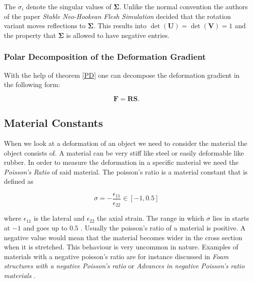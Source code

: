 The $\sigma_i$ denote the singular values of $\mathbf{\Sigma}$. Unlike the normal convention the authors of the paper \textit{Stable Neo-Hookean Flesh Simulation} decided that the rotation variant moves reflections to $\mathbf{\Sigma}$. This results into $\operatorname{det}(\mathbf{U})=\operatorname{det}(\mathbf{V})=1$ and the property that $\mathbf{\Sigma}$ is allowed to have negative entries.




\subsubsection{Polar Decomposition of the Deformation Gradient}
With the help of theorem \ref{PD} one can decompose the deformation gradient in the following form:

\[
\mathbf{F} = \mathbf{RS}.
\]



\subsection{Material Constants}
When we look at a deformation of an object we need to consider the material the object consists of. A material can be very stiff like steel or easily deformable like rubber. In order to measure the deformation in a specific material we need the \textit{Poisson's Ratio} of said material. The poisson's ratio is a material constant that is defined as 

\begin{equation}\label{eq:poisson}
\sigma = - \frac{\epsilon_{11}}{\epsilon_{22}} \in [-1, 0.5]
\end{equation}

where $\epsilon_{11}$ is the lateral and $\epsilon_{22}$ the axial strain. The range in which $\sigma$ lies in starts at $-1$ and goes up to $0.5$ \cite{PhysRevB.80.132104}. Usually the poisson's ratio of a material is positive. A negative value would mean that the material becomes wider in the cross section when it is stretched. This behaviour is very uncommon in nature. Examples of materials with a negative poisson's ratio are for instance discussed in \textit{Foam structures with a negative Poisson's ratio} \cite{lakes1987foam} or \textit{Advances in negative Poisson's ratio materials} \cite{lakes1993advances}.

